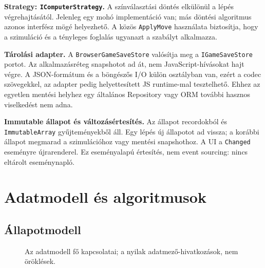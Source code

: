 \documentclass[11pt,a4paper]{article}
\newcommand{\code}[1]{\nolinkurl{#1}}
\begin{document}
\textbf{Strategy: \code{IComputerStrategy}.} A színválasztási döntés elkülönül a lépés végrehajtásától. Jelenleg egy mohó implementáció van; más döntési algoritmus azonos interfész mögé helyezhető. A közös \code{ApplyMove} használata biztosítja, hogy a szimuláció és a tényleges foglalás ugyanazt a szabályt alkalmazza.

\textbf{Tárolási adapter.} A \code{BrowserGameSaveStore} valósítja meg a \code{IGameSaveStore} portot. Az alkalmazásréteg snapshotot ad át, nem JavaScript-hívásokat hajt végre. A JSON-formátum és a böngészős I/O külön osztályban van, ezért a codec szövegekkel, az adapter pedig helyettesített JS runtime-mal tesztelhető. Ehhez az egyetlen mentési helyhez egy általános Repository vagy ORM további hasznos viselkedést nem adna.

\textbf{Immutable állapot és változásértesítés.} Az állapot recordokból és \code{ImmutableArray} gyűjteményekből áll. Egy lépés új állapotot ad vissza; a korábbi állapot megmarad a szimulációhoz vagy mentési snapshothoz. A UI a \code{Changed} eseményre újrarenderel. Ez eseményalapú értesítés, nem event sourcing: nincs eltárolt eseménynapló.

\section{Adatmodell és algoritmusok}
\subsection{Állapotmodell}
\begin{figure}[htbp]\centering
{}
\caption{Az adatmodell fő kapcsolatai; a nyilak adatmező-hivatkozások, nem öröklések.}
\end{figure}
\end{document}

